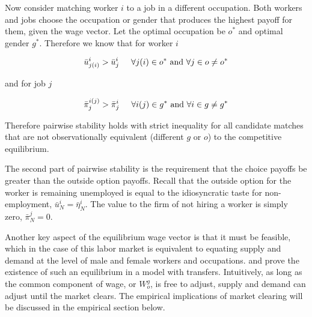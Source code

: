 \documentclass[12pt]{article}
\begin{document}
Now consider matching worker $i$ to a job in a different occupation. Both workers and jobs choose the occupation or gender that produces the highest payoff for them, given the wage vector. Let the optimal occupation be $o^*$ and optimal gender $g^*$. Therefore we know that for worker $i$

$$\bar{u}^{i}_{j(i)} > \bar{u}^{i}_{j} \hspace{5mm} \forall j(i) \in o^* \text{  and  } \forall j \in o \neq o^*$$

and for job $j$

$$\bar{\pi}^{i(j)}_{j} > \bar{\pi}^{i}_j \hspace{5mm} \forall i(j) \in g^* \text{  and  } \forall i \in g \neq g^*$$

Therefore pairwise stability holds with strict inequality for all candidate matches that are not observationally equivalent (different $g$ or $o$) to the competitive equilibrium.

The second part of pairwise stability is the requirement that the choice payoffs be greater than the outside option payoffs. Recall that the outside option for the worker is remaining unemployed is equal to the idiosyncratic taste for non-employment, $ \bar{u}^i_N = \bar{\eta}^i_N$. The value to the firm of not hiring a worker is simply zero, $\bar{\pi}^j_N = 0$.



Another key aspect of the equilibrium wage vector is that it must be feasible, which in the case of this labor market is equivalent to equating supply and demand at the level of male and female workers and occupations.  and  prove the existence of such an equilibrium in a model with transfers. Intuitively, as long as the common component of wage, or $W^g_o$, is free to adjust, supply and demand can adjust until the market clears. The empirical implications of market clearing will be discussed in the empirical section below.

\end{document}
